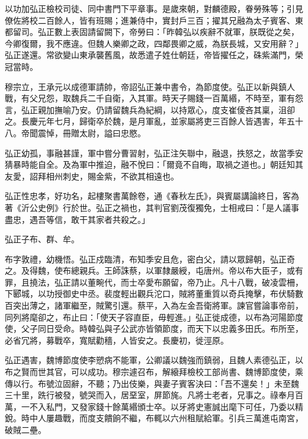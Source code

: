 \begin{pinyinscope}
 以功加弘正檢校司徒、同中書門下平章事。是歲來朝，對麟德殿，眷勞殊等；引見僚佐將校二百餘人，皆有班賜；進兼侍中，實封戶三百；擢其兄融為太子賓客、東都留司。弘正數上表固請留闕下，帝勞曰：「昨韓弘以疾辭不就軍，朕既從之矣，今卿復爾，我不應違。但魏人樂卿之政，四鄰畏卿之威，為朕長城，又安用辭？」弘正遂還。常欲變山東承襲舊風，故悉遣子姓仕朝廷，帝皆擢任之，硃紫滿門，榮冠當時。



 穆宗立，王承元以成德軍請帥，帝詔弘正兼中書令，為節度使。弘正以新與鎮人戰，有父兄怨，取魏兵二千自衛，入其軍。時天子賜錢一百萬緡，不時至，軍有怨言，弘正親加撫喻乃安。仍請留魏兵為紀綱，以持眾心，度支崔倰吝其稟，沮卻之。長慶元年七月，歸衛卒於魏，是月軍亂，並家屬將吏三百餘人皆遇害，年五十八。帝聞震悼，冊贈太尉，謚曰忠愍。



 弘正幼孤，事融甚謹，軍中嘗分曹習射，弘正注矢聯中，融退，抶怒之，故當季安猜暴時能自全。及為軍中推迫，融不悅曰：「爾竟不自晦，取禍之道也。」朝廷知其友愛，詔拜相州刺史，賜金紫，不欲其相遠也。



 弘正性忠孝，好功名，起樓聚書萬餘卷，通《春秋左氏》，與賓屬講論終日，客為著《沂公史例》行於世。弘正之禍也，其判官劉茂復獨免，士相戒曰：「是人議事盡忠，遇吾等信，敢干其家者共殺之。」



 弘正子布、群、牟。



 布字敦禮，幼機悟。弘正戍臨清，布知季安且危，密白父，請以眾歸朝，弘正奇之。及得魏，使布總親兵。王師誅蔡，以軍隸嚴綬，屯唐州。帝以布大臣子，或有罪，且撓法，弘正請以董畹代，而士卒愛布願留，帝乃止。凡十八戰，破凌雲柵，下郾城，以功授御史中丞。裴度輕出觀兵沱口，賊將董重質以奇兵掩擊，布伏騎數百突出薄之，諸軍繼至，賊驚引還。蔡平，入為左金吾衛將軍。諫官嘗論事帝前，同列將麾卻之，布止曰：「使天子容直臣，毋輕進。」弘正徙成德，以布為河陽節度使，父子同日受命。時韓弘與子公武亦皆領節度，而天下以忠義多田氏。布所至，必省冗將，募戰卒，寬賦勸穡，人皆安之。長慶初，徙涇原。



 弘正遇害，魏博節度使李愬病不能軍，公卿議以魏強而鎮弱，且魏人素德弘正，以布之賢而世其官，可以成功。穆宗遽召布，解縗拜檢校工部尚書、魏博節度使，乘傳以行。布號泣固辭，不聽；乃出伎樂，與妻子賓客決曰：「吾不還矣！」未至魏三十里，跣行被發，號哭而入，居堊室，屏節旄。凡將士老者，兄事之。祿奉月百萬，一不入私門，又發家錢十餘萬緡頒士卒。以牙將史憲誠出麾下可任，乃委以精銳。時中人屢趣戰，而度支饋餉不繼，布輒以六州租賦給軍。引兵三萬進屯南宮，破賊二壘。




\end{pinyinscope}
